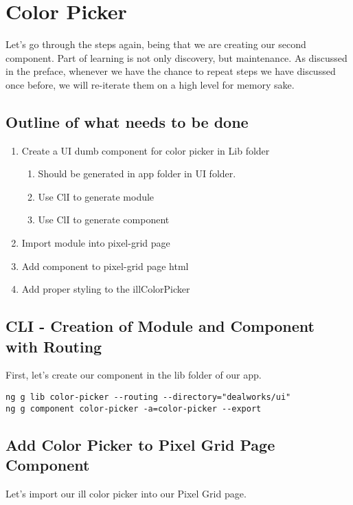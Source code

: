 \maketitle{}
\section{ Color Picker }

Let's go through the steps again, being that we are creating our second
component. Part of learning is not only discovery, but maintenance. As discussed
in the preface, whenever we have the chance to repeat steps we have discussed
once before, we will re-iterate them on a high level for memory sake.

\subsection{ Outline of what needs to be done }
\begin{enumerate}
  \item Create a UI dumb component for color picker in Lib folder
    \begin{enumerate}
      \item Should be generated in app folder in UI folder.
      \item Use ClI to generate module
      \item Use ClI to generate component
    \end{enumerate}
  \item Import module into pixel-grid page
  \item Add component to pixel-grid page html
  \item Add proper styling to the illColorPicker
\end{enumerate}

\subsection{ CLI - Creation of Module and Component with Routing }
First, let's create our component in the lib folder of our app.

\begin{lstlisting}
ng g lib color-picker --routing --directory="dealworks/ui"
ng g component color-picker -a=color-picker --export
\end{lstlisting}

\subsection{ Add Color Picker to Pixel Grid Page Component }
Let's import our ill color picker into our Pixel Grid page.

